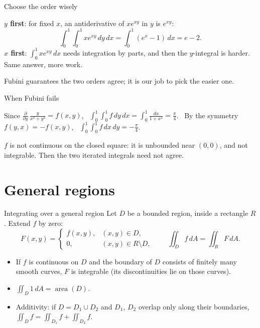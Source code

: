 \documentclass[10pt]{wosm-slides}
\newcommand{\dA}{\, dA}
\begin{document}
\begin{frame}{Choose the order wisely}
  \begin{example}[{$\iint_R x\, e^{xy} \dA$, \ $R = [0, 1] \times [0, 1]$}]
    \textbf{$y$ first}: for fixed $x$, an antiderivative of $x e^{xy}$ in $y$ is $e^{xy}$:
    \[ \int_0^1 \int_0^1 x e^{xy}\, dy\, dx = \int_0^1 (e^x - 1)\, dx = e - 2 . \]
    \pause
    \textbf{$x$ first}: $\int_0^1 x e^{xy}\, dx$ needs integration by parts, and then the $y$-integral is
    harder. Same answer, more work.
  \end{example}
  \pause
  {\small Fubini guarantees the two orders agree; it is our job to pick the easier one.\par}
\end{frame}

\begin{frame}{When Fubini fails}
  \begin{example}[{$f(x, y) = \dfrac{x^2 - y^2}{(x^2 + y^2)^2}$ on $[0, 1] \times [0, 1]$}]
    Since $\frac{\partial}{\partial y}\, \frac{y}{x^2 + y^2} = f(x, y)$, \
    $\displaystyle \int_0^1 \int_0^1 f\, dy\, dx = \int_0^1 \frac{dx}{1 + x^2} = \frac\pi4$. \
    By the symmetry $f(y, x) = -f(x, y)$, \
    $\displaystyle \int_0^1 \int_0^1 f\, dx\, dy = -\frac\pi4$.
  \end{example}
  \pause
  \begin{warning}
    $f$ is not continuous on the closed square: it is unbounded near $(0, 0)$, and not integrable.
    Then the two iterated integrals need not agree.
  \end{warning}
\end{frame}

\section{General regions}

\begin{frame}{Integrating over a general region}
  Let $D$ be a bounded region, inside a rectangle $R$. Extend $f$ by zero:
  \[ F(x, y) = \begin{cases} f(x, y), & (x, y) \in D, \\ 0, & (x, y) \in R \setminus D, \end{cases}
     \qquad \iint_D f \dA = \iint_R F \dA . \]
  \pause
  \begin{itemize}
    \item If $f$ is continuous on $D$ and the boundary of $D$ consists of finitely many smooth curves,
      $F$ is integrable (its discontinuities lie on those curves).
    \item $\iint_D 1 \dA = \operatorname{area}(D)$.
    \item Additivity: if $D = D_1 \cup D_2$ and $D_1$, $D_2$ overlap only along their boundaries,
      $\iint_D f = \iint_{D_1} f + \iint_{D_2} f$.
  \end{itemize}
\end{frame}
\end{document}
